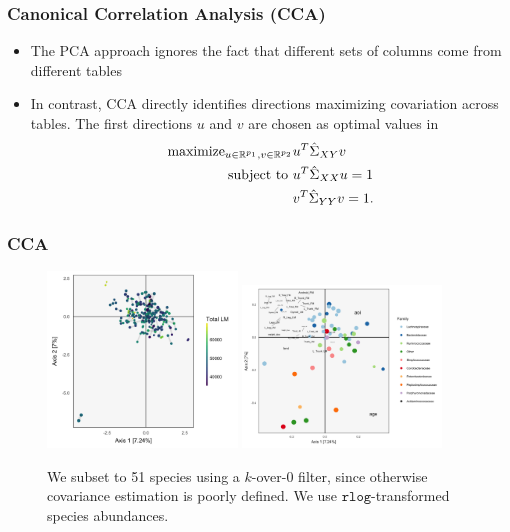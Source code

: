 \documentclass{beamer}
\begin{document}
\begin{frame}
  \frametitle{Canonical Correlation Analysis (CCA)}
\begin{itemize}
\item The PCA approach ignores the fact that different sets of columns come from
  different tables
\item In contrast, CCA directly identifies directions maximizing
  covariation across tables. The first directions $u$ and $v$ are chosen as
  optimal values in
\begin{align*}
  \text{maximize}_{u \in \mathbb{R}^{p_{1}}, v \in \mathbb{R}^{p_{2}}}
  &u^{T}\hat{\Sigma}_{XY}v \\
  \text{subject to } & u^{T}\hat{\Sigma}_{XX}u = 1 \nonumber \\
  & v^{T}\hat{\Sigma}_{YY}v = 1. \nonumber
\end{align*}
\end{itemize}
\end{frame}

\begin{frame}
  \frametitle{CCA}
  \begin{figure}[ht]
    \centering
    \includegraphics[width=0.45\textwidth]{figure/cca_scores_lm}
    \includegraphics[width=0.47\textwidth]{figure/cca_loadings}
    \caption{We subset to 51 species using a $k$-over-$0$ filter, since
      otherwise covariance estimation is poorly defined. We use
      $\texttt{rlog}$-transformed species abundances.\label{fig:cca_scores}}
  \end{figure}
\end{frame}
\end{document}
